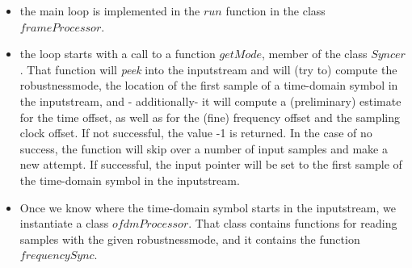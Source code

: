 \documentclass[11pt]{article}
\begin{document}
\begin{itemize}
\item the main loop is implemented in the $run$ function in
the class $frameProcessor$.
\item the loop starts with a call to a function $getMode$, member of
the class $Syncer$.  That function
will {\em peek} into the inputstream and
will (try to) compute the robustnessmode, the location of the first
sample of a time-domain symbol in the inputstream,
and - additionally- it will compute a (preliminary) estimate for
the time offset, as well as for
the (fine) frequency offset and the
sampling clock offset. If not successful, the value
-1 is returned.
In the case of no success, the function will skip over
a number of input samples and make a new attempt.
If successful, the input pointer will be set to the first sample
of the time-domain symbol in the inputstream.
\item Once we know where the time-domain symbol starts in the inputstream, we
instantiate a class $ofdmProcessor$. That class
contains functions for reading samples with the given robustnessmode, and
it contains the function $frequencySync$.


\end{itemize}
\end{document}
